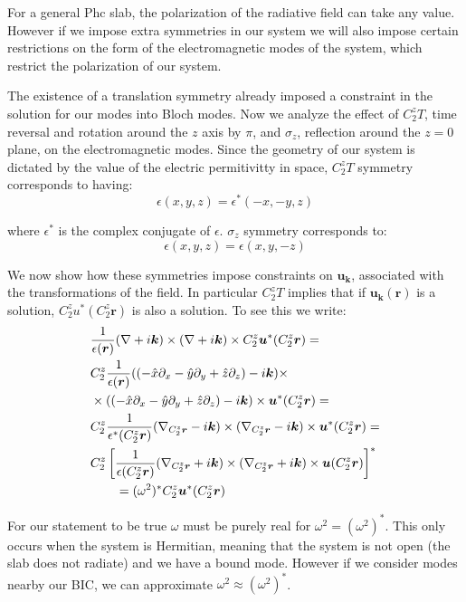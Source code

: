 For a general Phc slab, the polarization of the radiative field can take any value. However if we impose extra symmetries in our system we will also impose certain restrictions on the form of the electromagnetic modes of the system, which restrict the polarization of our system.

The existence of a translation symmetry already imposed a constraint in the solution for our modes into Bloch modes. Now we analyze the effect of $C_2^z T$, time reversal and rotation around the $z$ axis by $\pi$, and $\sigma_z$, reflection around the $z=0$ plane, on the electromagnetic modes. Since the geometry of our system is dictated by the value of the electric permitivitty in space, $C_2^zT$ symmetry corresponds to having:
\begin{equation}
\epsilon(x,y,z) = \epsilon^*(-x,-y,z)
\end{equation}

\noindent where $\epsilon^*$ is the complex conjugate of $\epsilon$. $\sigma_z$ symmetry corresponds to:
\begin{equation}
  \epsilon(x,y,z) = \epsilon(x,y,-z)
\end{equation}

We now show how these symmetries impose constraints on $\bm{u}_{\bm{k}}$, associated with the transformations of the field. In particular $C_2^zT$ implies that if $\bm{u}_{\bm{k}}(\bm{r})$ is a solution, $C_2^zu^*(C_2^z \bm{r})$ is also a solution. To see this we write:
\begin{align}
  &\frac{1}{\epsilon(\bm{r})} (\nabla + i\bm{k})\times (\nabla + i\bm{k})\times C_2^z\bm{u}^*(C_2^z \bm{r})=\\
  & C_2^z\frac{1}{\epsilon(\bm{r})} ((-\hat{x}\partial_x - \hat{y}\partial_y + \hat{z}\partial_z) - i\bm{k})\times\notag\\
  &\times ((-\hat{x}\partial_x - \hat{y}\partial_y + \hat{z}\partial_z) - i\bm{k})\times \bm{u}^*(C_2^z \bm{r})=\notag\\
  & C_2^z\frac{1}{\epsilon^*(C_2^z\bm{r})} (\nabla_{C_2^z\bm{r}} - i\bm{k})\times (\nabla_{C_2^z\bm{r}} - i\bm{k})\times \bm{u}^*(C_2^z \bm{r})=\notag\\
  & C_2^z\left[\frac{1}{\epsilon(C_2^z\bm{r})} (\nabla_{C_2^z\bm{r}} + i\bm{k})\times (\nabla_{C_2^z\bm{r}} + i\bm{k})\times \bm{u}(C_2^z \bm{r})\right]^*\notag\\
  & \quad \quad= (\omega^2)^* C_2^z \bm{u}^*(C_2^z \bm{r})
\end{align}

For our statement to be true $\omega$ must be purely real for $\omega^2 = (\omega^2)^*$. This only occurs when the system is Hermitian, meaning that the system is not open (the slab does not radiate) and we have a bound mode. However if we consider modes nearby our BIC, we can approximate $\omega^2 \approx (\omega^2)^*$.

